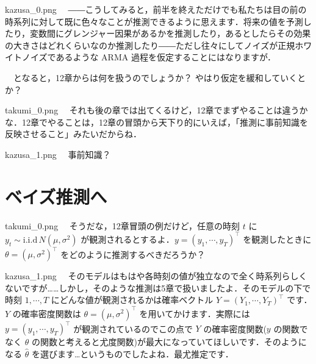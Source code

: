 \documentclass[b5paper,xelatex,ja=standard,10pt]{bxjsarticle}
\begin{document}
\begin{SERIFU}[colback=PaleIris]{kazusa_0.png}
　――こうしてみると，前半を終えただけでも私たちは目の前の時系列に対して既に色々なことが推測できるように思えます．将来の値を予測したり，変数間にグレンジャー因果があるかを推測したり，あるとしたらその効果の大きさはどれくらいなのか推測したり――ただし往々にしてノイズが正規ホワイトノイズであるような ARMA 過程を仮定することにはなりますが．

　となると，12章からは何を扱うのでしょうか？ やはり仮定を緩和していくとか？
\end{SERIFU}


\begin{SERIFU}[colback=PaleGold]{takumi_0.png}
　それも後の章では出てくるけど，12章でまずやることは違うかな．12章でやることは，12章の冒頭から天下り的にいえば，{「推測に事前知識を反映させること」}みたいだからね．
\end{SERIFU}


\begin{SERIFU}[colback=PaleIris]{kazusa_1.png}
　事前知識？
\end{SERIFU}


\section*{ベイズ推測へ}
\vspace{3pt}


\begin{SERIFU}[colback=PaleGold]{takumi_0.png}
　そうだな，12章冒頭の例だけど，任意の時刻 $t$ に $y_t \sim \mathrm{i.i.d} \, N(\mu, \sigma^2)$ が観測されるとするよ．$y = (y_1, \cdots, y_T)^\top$ を観測したときに $\theta = (\mu, \sigma^2)^\top$ をどのように推測するべきだろうか？
\end{SERIFU}


\begin{SERIFU}[colback=PaleIris]{kazusa_1.png}
　そのモデルはもはや各時刻の値が独立なので全く時系列らしくないですが……しかし，そのような推測は5章で扱いましたよ．そのモデルの下で時刻 $1, \cdots, T$ にどんな値が観測されるかは確率ベクトル $Y = (Y_1, \cdots, Y_T)^\top$ です．$Y$ の確率密度関数は $\theta = (\mu, \sigma^2)^\top$ を用いてかけます．実際には $y = (y_1, \cdots, y_T)^\top$ が観測されているのでこの点で $Y$ の確率密度関数($y$ の関数でなく $\theta$ の関数と考えると尤度関数)が最大になっていてほしいです．そのようになる $\hat{\theta}$ を選びます…というものでしたよね．最尤推定です．
\end{SERIFU}
\end{document}
